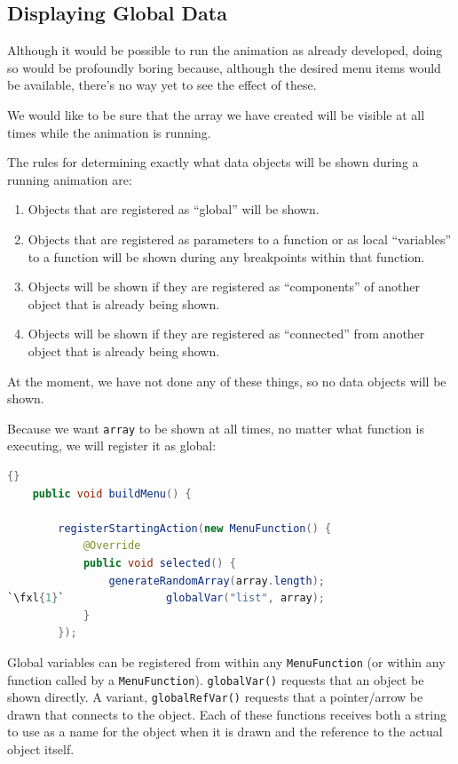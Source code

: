 \documentclass[11pt,titlepage]{book}
\def\fxl#1{%
\newdimen\fxlheight\setlength{\fxlheight}{#1\baselineskip}%
\advance\fxlheight by -0.5\baselineskip%
\begin{picture}(0,0)%
\setlength{\unitlength}{\baselineskip}%
\put(0,0){\makebox(0,0.75)[tl]{%
\colorbox{paleyellow}{%
\rule{0pt}{\fxlheight}%
\rule{\linewidth}{0pt}}%
}}\end{picture}%
}
\begin{document}
\subsection{Displaying Global Data}\label{displayingGlobal}

Although it would be possible to run the animation as already
developed, doing so would be profoundly boring because, although the
desired menu items would be available, there's no way yet to see the
effect of these.

We would like to be sure that the array we have created will be visible
at all times while the animation is running.

The rules for determining exactly what data objects will be shown during a running animation are:
\begin{enumerate}
\item Objects that are registered as ``global'' will be shown.
\item Objects that are registered as parameters to a function or as
  local ``variables'' to a function will be shown during any breakpoints within
  that function.
\item Objects will be shown if they  are registered as ``components''
  of another object that is already being shown.
\item Objects will be shown if they  are registered as ``connected''
  from another object that is already being shown.
\end{enumerate}
At the moment, we have not done any of these things, so no data objects 
will be shown.

Because we want \texttt{array} to be shown at all times, no matter what function is executing, we will register it as global:
\begin{lstlisting}[language=Java,frame=tb]{}
    public void buildMenu() {

        registerStartingAction(new MenuFunction() {
            @Override
            public void selected() {
                generateRandomArray(array.length);
`\fxl{1}`                globalVar("list", array);
            }
        });
\end{lstlisting}
Global variables can be registered from within any
\texttt{MenuFunction} (or within any function called by a
\texttt{MenuFunction}). \texttt{globalVar()} requests that an object
be shown directly. A variant, \texttt{globalRefVar()} requests that a
pointer/arrow be drawn that connects to the object. Each of these
functions receives both a string to use as a name for the object when
it is drawn and the reference to the actual object itself.
\end{document}
